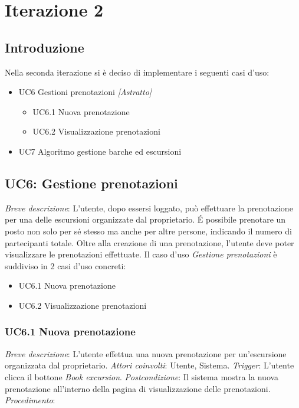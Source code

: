 \section{Iterazione 2}

\subsection{Introduzione}
Nella seconda iterazione si è deciso di implementare i seguenti casi d'uso:

\begin{itemize}
    \item UC6 Gestioni prenotazioni \textit{[Astratto]}
    \begin{itemize}
        \item UC6.1 Nuova prenotazione
        \item UC6.2 Visualizzazione prenotazioni
    \end{itemize}
    \item UC7 Algoritmo gestione barche ed escursioni
\end{itemize}

\subsection{UC6: Gestione prenotazioni}
\emph{Breve descrizione}: L'utente, dopo essersi loggato, può effettuare la prenotazione per una delle escursioni organizzate dal proprietario. É possibile prenotare un posto non solo per sé stesso ma anche per altre persone, indicando il numero di partecipanti totale. Oltre alla creazione di una prenotazione, l'utente deve poter visualizzare le prenotazioni effettuate.
Il caso d'uso \textit{Gestione prenotazioni} è suddiviso in 2 casi d'uso concreti:

\begin{itemize}
    \item UC6.1 Nuova prenotazione
    \item UC6.2 Visualizzazione prenotazioni 
\end{itemize}

\subsubsection{UC6.1 Nuova prenotazione}
 \emph{Breve descrizione}: L'utente effettua una nuova prenotazione per un'escursione organizzata dal proprietario.\medbreak
 \emph{Attori coinvolti}: Utente, Sistema.\medbreak
 \emph{Trigger}: L'utente clicca il bottone \textit{Book excursion}.\medbreak
 \emph{Postcondizione}: Il sistema mostra la nuova prenotazione all'interno della pagina di visualizzazione delle prenotazioni.\medbreak
 \emph{Procedimento}:

